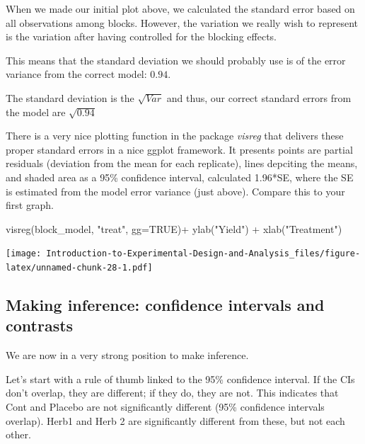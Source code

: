 \documentclass[
]{book}
\newenvironment{Shaded}{\begin{snugshade}}{\end{snugshade}}
\newcommand{\AttributeTok}[1]{\textcolor[rgb]{0.77,0.63,0.00}{#1}}
\newcommand{\ConstantTok}[1]{\textcolor[rgb]{0.00,0.00,0.00}{#1}}
\newcommand{\FunctionTok}[1]{\textcolor[rgb]{0.00,0.00,0.00}{#1}}
\newcommand{\NormalTok}[1]{#1}
\newcommand{\SpecialCharTok}[1]{\textcolor[rgb]{0.00,0.00,0.00}{#1}}
\newcommand{\StringTok}[1]{\textcolor[rgb]{0.31,0.60,0.02}{#1}}
\begin{document}
When we made our initial plot above, we calculated the standard error based on all observations among blocks. However, the variation we really wish to represent is the variation after having controlled for the blocking effects.

This means that the standard deviation we should probably use is of the error variance from the correct model: \(0.94\).

The standard deviation is the \(\sqrt{Var}\) and thus, our correct standard errors from the model are \(\sqrt{0.94}\)

There is a very nice plotting function in the package \emph{visreg} that delivers these proper standard errors in a nice ggplot framework. It presents points are partial residuals (deviation from the mean for each replicate), lines depciting the means, and shaded area as a 95\% confidence interval, calculated 1.96*SE, where the SE is estimated from the model error variance (just above). Compare this to your first graph.

\begin{Shaded}
\begin{Highlighting}[]
\FunctionTok{visreg}\NormalTok{(block\_model, }\StringTok{"treat"}\NormalTok{, }\AttributeTok{gg=}\ConstantTok{TRUE}\NormalTok{)}\SpecialCharTok{+}
  \FunctionTok{ylab}\NormalTok{(}\StringTok{"Yield"}\NormalTok{) }\SpecialCharTok{+} 
  \FunctionTok{xlab}\NormalTok{(}\StringTok{"Treatment"}\NormalTok{) }
\end{Highlighting}
\end{Shaded}

\texttt{[image: Introduction-to-Experimental-Design-and-Analysis\_files/figure-latex/unnamed-chunk-28-1.pdf]}

\hypertarget{making-inference-confidence-intervals-and-contrasts}{%
\subsection{Making inference: confidence intervals and contrasts}\label{making-inference-confidence-intervals-and-contrasts}}

We are now in a very strong position to make inference.

Let's start with a rule of thumb linked to the 95\% confidence interval. If the CIs don't overlap, they are different; if they do, they are not. This indicates that Cont and Placebo are not significantly different (95\% confidence intervals overlap). Herb1 and Herb 2 are significantly different from these, but not each other.
\end{document}
